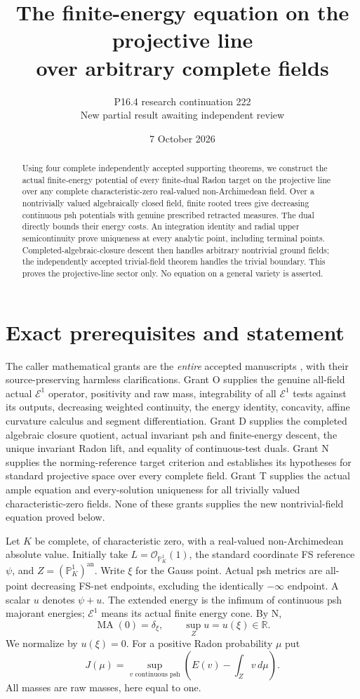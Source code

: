 \documentclass[11pt]{article}
\title{The finite-energy equation on the projective line\\over arbitrary complete fields}
\author{P16.4 research continuation 222\\New partial result awaiting independent review}
\date{7 October 2026}
\newcommand{\MA}{\operatorname{MA}}
\newcommand{\E}{\mathcal E}
\newcommand{\an}{\mathrm{an}}
\begin{document}
\maketitle
\begin{abstract}
Using four complete independently accepted supporting theorems, we
construct the actual finite-energy potential of every finite-dual
Radon target on the projective line over any complete
characteristic-zero real-valued non-Archimedean field. Over a
nontrivially valued algebraically closed field, finite rooted trees
give decreasing continuous psh potentials with genuine prescribed
retracted measures. The dual directly bounds their energy costs.
An integration identity and radial upper semicontinuity prove
uniqueness at every analytic point, including terminal points.
Completed-algebraic-closure descent then handles arbitrary
nontrivial ground fields; the independently accepted trivial-field
theorem handles the trivial boundary. This proves the projective-line
sector only. No equation on a general variety is asserted.
\end{abstract}

\section{Exact prerequisites and statement}

The caller mathematical grants are the \emph{entire} accepted
manuscripts \cite{O,D,N,T}, with their source-preserving harmless
clarifications. Grant O supplies the genuine all-field actual
$\E^1$ operator, positivity and raw mass, integrability of all
$\E^1$ tests against its outputs, decreasing weighted continuity,
the energy identity, concavity, affine curvature calculus and
segment differentiation. Grant D supplies the completed algebraic
closure quotient, actual invariant psh and finite-energy descent,
the unique invariant Radon lift, and equality of continuous-test
duals. Grant N supplies the norming-reference target criterion and
establishes its hypotheses for standard projective space over
every complete field. Grant T supplies the actual ample equation
and every-solution uniqueness for all trivially valued
characteristic-zero fields. None of these grants supplies the new
nontrivial-field equation proved below.

Let $K$ be complete, of characteristic zero, with a real-valued
non-Archimedean absolute value. Initially take
$L=\mathcal O_{\mathbb P^1_K}(1)$, the standard coordinate FS
reference $\psi$, and $Z=(\mathbb P^1_K)^\an$. Write $\xi$ for the
Gauss point. Actual psh metrics are all-point decreasing FS-net
endpoints, excluding the identically $-\infty$ endpoint. A scalar
$u$ denotes $\psi+u$. The extended energy is the infimum of
continuous psh majorant energies; $\E^1$ means its actual finite
energy cone. By N,
\[
 \MA(0)=\delta_\xi,\qquad \sup_Zu=u(\xi)\in\mathbb R.
\]
We normalize by $u(\xi)=0$. For a positive Radon probability $\mu$
put
\[
 J(\mu)=\sup_{v\text{ continuous psh}}
                \left(E(v)-\int_Zv\,d\mu\right).
\]
All masses are raw masses, here equal to one.
\end{document}
